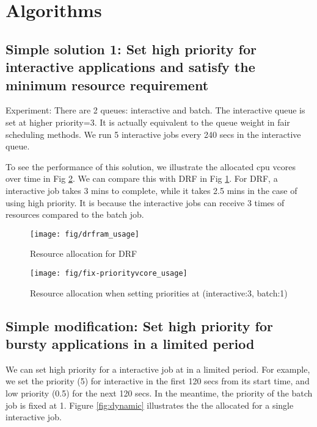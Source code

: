 \section{Algorithms }

%

\subsection{Simple solution 1: Set high priority for interactive applications and satisfy the minimum resource requirement}

Experiment: There are 2 queues: interactive and batch. The interactive queue is set at higher priority=3. It is actually equivalent to the queue weight in fair scheduling methods. We run 5 interactive jobs every 240 secs in the interactive queue.

To see the performance of this solution, we illustrate the allocated cpu vcores over time in Fig \ref{fig:fix}. We can compare this with DRF in Fig \ref{fig:drf}. For DRF, a interactive job takes 3 mins to complete, while it takes 2.5 mins in the case of using high priority. It is because the interactive jobs can receive 3 times of resources compared to the batch job.

\begin{figure}
\centering
\texttt{[image: fig/drfram\_usage]}
\caption{Resource allocation for DRF}
\label{fig:drf}
\end{figure}

\begin{figure}
	\centering
	\texttt{[image: fig/fix-priorityvcore\_usage]}
	\caption{Resource allocation when setting priorities at (interactive:3, batch:1) }
	\label{fig:fix}
\end{figure}

\newpage

\subsection*{Simple modification: Set high priority for bursty applications in a limited period}

We can set high priority for a interactive job at in a limited period. For example, we set the priority (5) for interactive in the first 120 secs from its start time, and low priority (0.5) for the next 120 secs. In the meantime, the priority of the batch job is fixed at 1. Figure \ref{fig:dynamic} illustrates the the allocated for a single interactive job.

